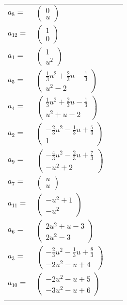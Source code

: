 \documentclass[1p]{elsarticle_modified}
\theoremstyle{definition}
\begin{document}
\begin{tabular}{m{7pt} m{180pt} m{7pt} m{180pt} }
\flushright $a_{8}=$&$\begin{pmatrix}0\\u\end{pmatrix}$ \\
\flushright $a_{12}=$&$\begin{pmatrix}1\\0\end{pmatrix}$ \\
\flushright $a_{1}=$&$\begin{pmatrix}1\\u^2\end{pmatrix}$ \\
\flushright $a_{5}=$&$\begin{pmatrix}\frac{1}{3} u^2+\frac{2}{3} u-\frac{1}{3}\\u^2-2\end{pmatrix}$ \\
\flushright $a_{4}=$&$\begin{pmatrix}\frac{1}{3} u^2+\frac{2}{3} u-\frac{1}{3}\\u^2+u-2\end{pmatrix}$ \\
\flushright $a_{2}=$&$\begin{pmatrix}-\frac{2}{3} u^2-\frac{1}{3} u+\frac{5}{3}\\1\end{pmatrix}$ \\
\flushright $a_{9}=$&$\begin{pmatrix}-\frac{4}{3} u^2-\frac{2}{3} u+\frac{7}{3}\\- u^2+2\end{pmatrix}$ \\
\flushright $a_{7}=$&$\begin{pmatrix}u\\u\end{pmatrix}$ \\
\flushright $a_{11}=$&$\begin{pmatrix}- u^2+1\\- u^2\end{pmatrix}$ \\
\flushright $a_{6}=$&$\begin{pmatrix}2 u^2+u-3\\2 u^2-3\end{pmatrix}$ \\
\flushright $a_{3}=$&$\begin{pmatrix}-\frac{2}{3} u^2-\frac{1}{3} u+\frac{8}{3}\\-2 u^2- u+4\end{pmatrix}$ \\
\flushright $a_{10}=$&$\begin{pmatrix}-2 u^2- u+5\\-3 u^2- u+6\end{pmatrix}$\\&\end{tabular}
\end{document}
